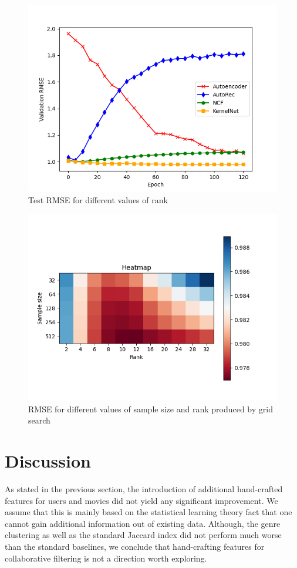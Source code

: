 \documentclass[10pt,conference,compsocconf]{IEEEtran}
\begin{document}
    \begin{figure}
        \includegraphics[width=\columnwidth]{figures/validation_plot.png}
        \caption{Test RMSE for different values of rank}
        \label{fig:validation}
    \end{figure}



    \begin{figure}
        \includegraphics[width=\columnwidth]{figures/heatmap.png}
        \caption{RMSE for different values of sample size and rank produced by grid search}
        \label{fig:Heatmap}
    \end{figure}


    \section{Discussion}
    As stated in the previous section, the introduction of additional hand-crafted features for users and movies did not yield any significant improvement.
    We assume that this is mainly based on the statistical learning theory fact that one cannot gain additional information out of existing data.
    Although, the genre clustering as well as the standard Jaccard index did not perform much worse than the standard baselines, we conclude that hand-crafting features for collaborative filtering is not a direction worth exploring.
\end{document}
